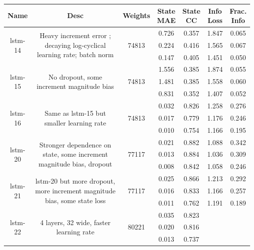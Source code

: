 \begin{table}[H]
\begin{sideways}
    \begin{tabular}{c|c|c|c|c|c|c }
    \small
Name & Desc & Weights & \thead{State\\MAE} & \thead{State\\CC} & \thead{Info\\Loss} &\thead{Frac.\\Info}\\
\hline
\multirow{3}{6em}{lstm-14} & \multirow{3}{16em}{Heavy increment error ; decaying log-cyclical learning rate; batch norm} & \multirow{3}{4em}{74813} & 0.726 & 0.357 & 1.847 & 0.065 \\ & & & 0.224 & 0.416 & 1.565 & 0.067 \\ & & & 0.147 & 0.405 & 1.451 & 0.050 \\
\hline
\multirow{3}{6em}{lstm-15} & \multirow{3}{16em}{No dropout, some increment magnitude bias} & \multirow{3}{4em}{74813} & 1.556 & 0.385 & 1.874 & 0.055 \\ & & & 1.481 & 0.385 & 1.558 & 0.060 \\ & & & 0.831 & 0.352 & 1.407 & 0.052 \\
\hline
\multirow{3}{6em}{lstm-16} & \multirow{3}{16em}{Same as lstm-15 but smaller learning rate} & \multirow{3}{4em}{74813} & 0.032 & 0.826 & 1.258 & 0.276 \\ & & & 0.017 & 0.779 & 1.176 & 0.246 \\ & & & 0.010 & 0.754 & 1.166 & 0.195 \\
\hline
\multirow{3}{6em}{lstm-20} & \multirow{3}{16em}{Stronger dependence on state, some increment magnitude bias, dropout} & \multirow{3}{4em}{77117} & 0.021 & 0.882 & 1.088 & 0.342 \\ & & & 0.013 & 0.884 & 1.036 & 0.309 \\ & & & 0.008 & 0.842 & 1.058 & 0.246 \\
\hline
\multirow{3}{6em}{lstm-21} & \multirow{3}{16em}{lstm-20 but more dropout, more increment magnitude bias, some state loss} & \multirow{3}{4em}{77117} & 0.025 & 0.866 & 1.213 & 0.292 \\ & & & 0.016 & 0.833 & 1.166 & 0.257 \\ & & & 0.011 & 0.762 & 1.191 & 0.189 \\
\hline
\multirow{3}{6em}{lstm-22} & \multirow{3}{16em}{4 layers, 32 wide, faster learning rate} & \multirow{3}{4em}{80221} & 0.035 & 0.823 &  &  \\ & & & 0.020 & 0.816 &  &  \\ & & & 0.013 & 0.737 &  &  \\

\end{tabular}
\end{sideways}
\end{table}
